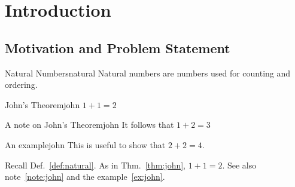%

\chapter{Introduction}
\label{sec:intro}


\section{Motivation and Problem Statement}
\label{sec:intro:motivation}

\blindtext


\begin{definition}{Natural Numbers}{natural}
	Natural numbers are numbers used for counting and ordering.
\end{definition}

\begin{theorem}{John's Theorem}{john}
	$ 1+1 = 2$
\end{theorem}

\begin{note}{A note on John's Theorem}{john}
	It follows that $ 1+2 = 3$
\end{note}

\begin{example}{An example}{john}
	This is useful to show that $2+2=4$.
\end{example}

Recall Def.~\ref{def:natural}.
As in Thm.~\ref{thm:john}, $1+1=2$.
See also note~\ref{note:john} and the example~\ref{ex:john}.






